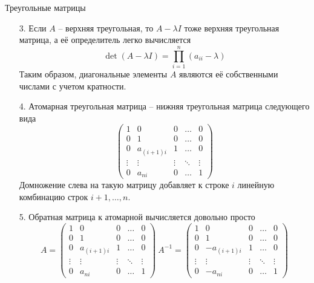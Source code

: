 \documentclass[10pt]{beamer}
\begin{document}
\begin{frame}{Треугольные матрицы}
\begin{itemize}[<+->]
\item[3.] Если $A$ -- верхняя треугольная, то $A-\lambda I$ тоже верхняя треугольная матрица, а её определитель легко вычисляется
$$
\det(A-\lambda I)=\prod_{i=1}^n(a_{ii}-\lambda)
$$
Таким образом, диагональные элементы $A$ являются её собственными числами с учетом кратности.
\item[4.] Атомарная треугольная матрица -- нижняя треугольная матрица следующего вида
$$
\left(\begin{array}{ccccc}
1 & 0 & 0 & \ldots & 0 \\
0 & 1 & 0 & \ldots & 0 \\
0 & a_{(i+1)i} & 1 & \ldots & 0 \\
\vdots & \vdots & \vdots & \ddots & \vdots \\
0 & a_{ni} & 0 & \ldots & 1
\end{array}\right)
$$
Домножение слева на такую матрицу добавляет к строке $i$ линейную комбинацию строк $i+1, \ldots, n$.
\end{itemize}

\end{frame}

\begin{frame}
\begin{itemize}[<+->]
\item [5.] Обратная матрица к атомарной вычисляется довольно просто
$$
A=\left(\begin{array}{ccccc}
1 & 0 & 0 & \ldots & 0 \\
0 & 1 & 0 & \ldots & 0 \\
0 & a_{(i+1)i} & 1 & \ldots & 0 \\
\vdots & \vdots & \vdots & \ddots & \vdots \\
0 & a_{ni} & 0 & \ldots & 1
\end{array}\right)
~A^{-1}=\left(\begin{array}{ccccc}
1 & 0 & 0 & \ldots & 0 \\
0 & 1 & 0 & \ldots & 0 \\
0 & -a_{(i+1)i} & 1 & \ldots & 0 \\
\vdots & \vdots & \vdots & \ddots & \vdots \\
0 & -a_{ni} & 0 & \ldots & 1
\end{array}\right)
$$
\end{itemize}
\end{frame}
\end{document}
